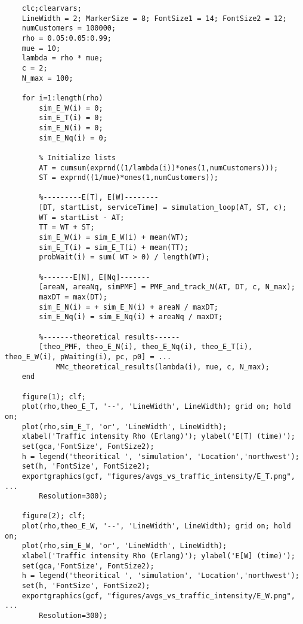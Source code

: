   \begin{lstlisting}[style=Matlab-editor, basicstyle=\ttfamily\footnotesize]
    %script to simulate and obtain E[T], E[W], E[N], E[Nq] vs traffic intensity
    clc;clearvars;
    LineWidth = 2; MarkerSize = 8; FontSize1 = 14; FontSize2 = 12;
    numCustomers = 100000;
    rho = 0.05:0.05:0.99;
    mue = 10;
    lambda = rho * mue;
    c = 2;
    N_max = 100;
    
    for i=1:length(rho)
        sim_E_W(i) = 0;
        sim_E_T(i) = 0;
        sim_E_N(i) = 0;
        sim_E_Nq(i) = 0;
    
        % Initialize lists
        AT = cumsum(exprnd((1/lambda(i))*ones(1,numCustomers)));
        ST = exprnd((1/mue)*ones(1,numCustomers));
      
        %---------E[T], E[W]--------
        [DT, startList, serviceTime] = simulation_loop(AT, ST, c);
        WT = startList - AT;
        TT = WT + ST;
        sim_E_W(i) = sim_E_W(i) + mean(WT);
        sim_E_T(i) = sim_E_T(i) + mean(TT);
        probWait(i) = sum( WT > 0) / length(WT);
        
        %-------E[N], E[Nq]-------
        [areaN, areaNq, simPMF] = PMF_and_track_N(AT, DT, c, N_max);
        maxDT = max(DT);
        sim_E_N(i) = + sim_E_N(i) + areaN / maxDT;
        sim_E_Nq(i) = sim_E_Nq(i) + areaNq / maxDT;
        
        %-------theoretical results------
        [theo_PMF, theo_E_N(i), theo_E_Nq(i), theo_E_T(i), theo_E_W(i), pWaiting(i), pc, p0] = ...
            MMc_theoretical_results(lambda(i), mue, c, N_max);
    end
    
    figure(1); clf;
    plot(rho,theo_E_T, '--', 'LineWidth', LineWidth); grid on; hold on;
    plot(rho,sim_E_T, 'or', 'LineWidth', LineWidth);
    xlabel('Traffic intensity Rho (Erlang)'); ylabel('E[T] (time)');
    set(gca,'FontSize', FontSize2);
    h = legend('theoritical ', 'simulation', 'Location','northwest');
    set(h, 'FontSize', FontSize2);
    exportgraphics(gcf, "figures/avgs_vs_traffic_intensity/E_T.png", ...
        Resolution=300);
    
    figure(2); clf;
    plot(rho,theo_E_W, '--', 'LineWidth', LineWidth); grid on; hold on;
    plot(rho,sim_E_W, 'or', 'LineWidth', LineWidth);
    xlabel('Traffic intensity Rho (Erlang)'); ylabel('E[W] (time)');
    set(gca,'FontSize', FontSize2);
    h = legend('theoritical ', 'simulation', 'Location','northwest');
    set(h, 'FontSize', FontSize2);
    exportgraphics(gcf, "figures/avgs_vs_traffic_intensity/E_W.png", ...
        Resolution=300);
    

\end{lstlisting}
